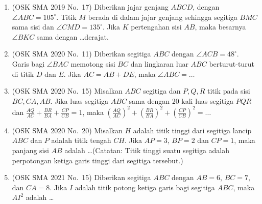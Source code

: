 \documentclass[12pt,a4paper]{article}
\begin{document}
\begin{enumerate}
\item (OSK SMA 2019 No.\ 17) Diberikan jajar genjang $ABCD$, dengan $\angle ABC=105^{\circ}$. Titik $M$ berada di dalam jajar genjang sehingga segitiga $BMC$ sama sisi dan $\angle CMD=135^{\circ}$. Jika $K$ pertengahan sisi $AB$, maka besarnya $\angle BKC$ sama dengan \dots derajat.

\item (OSK SMA 2020 No.\ 11) Diberikan segitiga $ABC$ dengan $\angle ACB=48^{\circ}$. Garis bagi $\angle BAC$ memotong sisi $BC$ dan lingkaran luar $ABC$ berturut-turut di titik $D$ dan $E$. Jika $AC=AB+DE$, maka $\angle ABC=\dots$

\item (OSK SMA 2020 No.\ 15) Misalkan $ABC$ segitiga dan $P, Q, R$ titik pada sisi $BC, CA, AB$. Jika luas segitiga $ABC$ sama dengan 20 kali luas segitiga $PQR$ dan $\frac{AQ}{AC}+\frac{BR}{BA}+\frac{CP}{CB}=1$, maka $\left(\frac{AQ}{AC}\right)^{2}+\left(\frac{BR}{BA}\right)^{2}+\left(\frac{CP}{CB}\right)^{2}=\dots$

\item (OSK SMA 2020 No.\ 20) Misalkan $H$ adalah titik tinggi dari segitiga lancip $ABC$ dan $P$ adalah titik tengah $CH$. Jika $AP=3$, $BP=2$ dan $CP=1$, maka panjang sisi $AB$ adalah \dots (Catatan: Titik tinggi suatu segitiga adalah perpotongan ketiga garis tinggi dari segitiga tersebut.)

\item (OSK SMA 2021 No.\ 15) Diberikan segitiga $ABC$ dengan $AB=6$, $BC=7$, dan $CA=8$. Jika $I$ adalah titik potong ketiga garis bagi segitiga $ABC$, maka $AI^{2}$ adalah \dots

\begin{figure}[H]
    \centering
\end{figure}


\end{enumerate}
\end{document}

